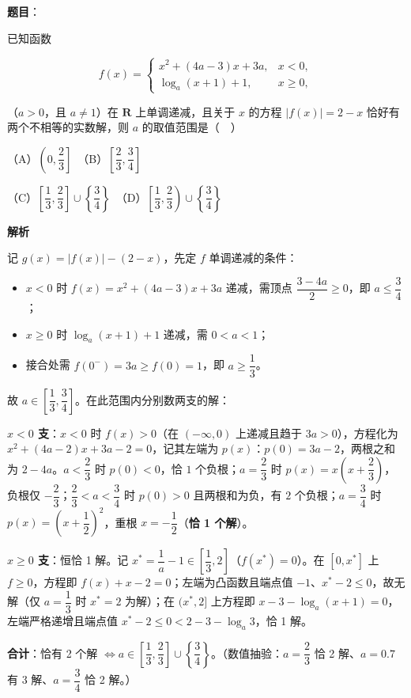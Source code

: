 \begin{answer}

\textbf{题目}：

已知函数

\nopagebreak[4]
\[
f(x)=\begin{cases}
x^{2}+(4a-3)x+3a, & x<0,\\
\log_{a}(x+1)+1, & x\geqslant 0,
\end{cases}
\]

（\(a>0\)，且 \(a\neq 1\)）在 \(\mathbf{R}\) 上单调递减，且关于 \(x\) 的方程 \(|f(x)|=2-x\) 恰好有两个不相等的实数解，则 \(a\) 的取值范围是（　）

（A）\(\left(0,\dfrac{2}{3}\right]\)　（B）\(\left[\dfrac{2}{3},\dfrac{3}{4}\right]\)

（C）\(\left[\dfrac{1}{3},\dfrac{2}{3}\right]\cup\left\{\dfrac{3}{4}\right\}\)　（D）\(\left[\dfrac{1}{3},\dfrac{2}{3}\right)\cup\left\{\dfrac{3}{4}\right\}\)

\textbf{解析}

记 \(g(x)=|f(x)|-(2-x)\)，先定 \(f\) 单调递减的条件：

\begin{itemize}
\item \(x<0\) 时 \(f(x)=x^{2}+(4a-3)x+3a\) 递减，需顶点 \(\dfrac{3-4a}{2}\geqslant0\)，即 \(a\leqslant\dfrac{3}{4}\)；
\item \(x\geqslant0\) 时 \(\log_{a}(x+1)+1\) 递减，需 \(0<a<1\)；
\item 接合处需 \(f(0^{-})=3a\geqslant f(0)=1\)，即 \(a\geqslant\dfrac{1}{3}\)。
\end{itemize}

故 \(a\in\left[\dfrac{1}{3},\dfrac{3}{4}\right]\)。在此范围内分别数两支的解：

\textbf{\(x<0\) 支}：\(x<0\) 时 \(f(x)>0\)（在 \((-\infty,0)\) 上递减且趋于 \(3a>0\)），方程化为 \(x^{2}+(4a-2)x+3a-2=0\)，记其左端为 \(p(x)\)：\(p(0)=3a-2\)，两根之和为 \(2-4a\)。\(a<\dfrac{2}{3}\) 时 \(p(0)<0\)，恰 \(1\) 个负根；\(a=\dfrac{2}{3}\) 时 \(p(x)=x\left(x+\dfrac{2}{3}\right)\)，负根仅 \(-\dfrac{2}{3}\)；\(\dfrac{2}{3}<a<\dfrac{3}{4}\) 时 \(p(0)>0\) 且两根和为负，有 \(2\) 个负根；\(a=\dfrac{3}{4}\) 时 \(p(x)=\left(x+\dfrac{1}{2}\right)^{2}\)，重根 \(x=-\dfrac{1}{2}\)（\textbf{恰 1 个解}）。

\textbf{\(x\geqslant0\) 支}：恒恰 1 解。记 \(x^{*}=\dfrac{1}{a}-1\in\left[\dfrac{1}{3},2\right]\)（\(f(x^{*})=0\)）。在 \([0,x^{*}]\) 上 \(f\geqslant0\)，方程即 \(f(x)+x-2=0\)；左端为凸函数且端点值 \(-1\)、\(x^{*}-2\leqslant0\)，故无解（仅 \(a=\dfrac{1}{3}\) 时 \(x^{*}=2\) 为解）；在 \((x^{*},2]\) 上方程即 \(x-3-\log_{a}(x+1)=0\)，左端严格递增且端点值 \(x^{*}-2\leqslant0<2-3-\log_{a}3\)，恰 1 解。

\textbf{合计}：恰有 2 个解 \(\iff a\in\left[\dfrac{1}{3},\dfrac{2}{3}\right]\cup\left\{\dfrac{3}{4}\right\}\)。（数值抽验：\(a=\dfrac{2}{3}\) 恰 2 解、\(a=0.7\) 有 3 解、\(a=\dfrac{3}{4}\) 恰 2 解。）


\end{answer}

